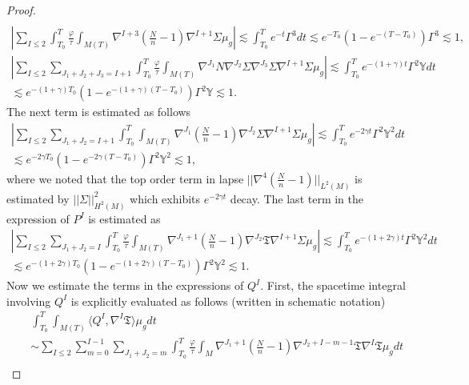 \documentclass{amsart}
\begin{document}
\begin{proof}
\begin{align}
\end{align}
\begin{align}
|\sum_{I\leq 2}\int_{T_{0}}^{T}\frac{\varphi}{\tau}\int_{M(T)}\nabla^{I+3}(\frac{N}{n}-1)\nabla^{I+1}\Sigma\mu_{g}|\lesssim \int_{T_{0}}^{T}e^{-t}\Gamma^{3}dt\lesssim e^{-T_{0}}(1-e^{-(T-T_{0})})\Gamma^{3}\lesssim 1,  
\end{align}
\begin{align}
|\sum_{I\leq 2}\sum_{J_{1}+J_{2}+J_{3}=I+1}\int_{T_{0}}^{T}\frac{\varphi}{\tau}\int_{M(T)}\nabla^{J_{1}}N\nabla^{J_{2}}\Sigma\nabla^{J_{3}}\Sigma\nabla^{I+1}\Sigma\mu_{g}|\lesssim   \int_{T_{0}}^{T}e^{-(1+\gamma)t}\Gamma^{2}\mathds{Y}dt\\\nonumber 
\lesssim e^{-(1+\gamma)T_{0}}(1-e^{-(1+\gamma)(T-T_{0})})\Gamma^{2}\mathds{Y}\lesssim 1.
\end{align}
The next term is estimated as follows 
\begin{align}
|\sum_{I\leq 2}\sum_{J_{1}+J_{2}=I+1}\int_{T_{0}}^{T}\int_{M(T)}\nabla^{J_{1}}(\frac{N}{n}-1)\nabla^{J_{2}}\Sigma\nabla^{I+1}\Sigma\mu_{g}|\lesssim \int_{T_{0}}^{T}e^{-2\gamma t}\Gamma^{2}\mathds{Y}^{2}dt\\\nonumber \lesssim e^{-2\gamma T_{0}}(1-e^{-2\gamma(T-T_{0})})\Gamma^{2}\mathds{Y}^{2}\lesssim 1,    
\end{align}
where we noted that the top order term in lapse $||\nabla^{4}(\frac{N}{n}-1)||_{L^{2}(M)}$ is estimated by $||\Sigma||^{2}_{H^{2}(M)}$ which exhibits $e^{-2\gamma t}$ decay. The last term in the expression of $P^{I}$ is estimated as 
\begin{align}
 |\sum_{I\leq 2}\sum_{J_{1}+J_{2}=I}\int_{T_{0}}^{T}\frac{\varphi}{\tau}\int_{M(T)}\nabla^{J_{1}+1}(\frac{N}{n}-1)\nabla^{J_{2}}\mathfrak{T}\nabla^{I+1}\Sigma\mu_{g}|\lesssim \int_{T_{0}}^{T}e^{-(1+2\gamma) t}\Gamma^{2}\mathds{Y}^{2} dt\\\nonumber 
 \lesssim e^{-(1+2\gamma) T_{0}}(1-e^{-(1+2\gamma)(T-T_{0})})\Gamma^{2}\mathds{Y}^{2}\lesssim 1.
\end{align}
Now we estimate the terms in the expressions of $Q^{I}$. First, the spacetime integral involving $Q^{I}$ is explicitly evaluated as follows (written in schematic notation) 
\begin{align}
&&\int_{T_{0}}^{T}\int_{M(T)}\langle Q^{I},\nabla^{I}\mathfrak{T}\rangle\mu_{g}dt  \\\nonumber 
&&\sim \sum_{I\leq 2}\sum_{m=0}^{I-1}\sum_{J_{1}+J_{2}=m}\int_{T_{0}}^{T}\frac{\varphi}{\tau}\int_{M}\nabla^{J_{1}+1}(\frac{N}{n}-1)\nabla^{J_{2}+I-m-1}\mathfrak{T}\nabla^{I}\mathfrak{T}\mu_{g}dt\\\nonumber 

\end{align}
\end{proof}
\end{document}
